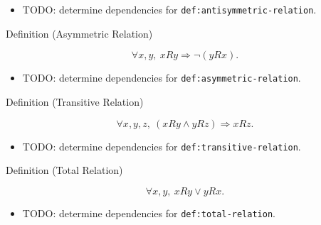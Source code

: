 \begin{dependencies}
\begin{itemize}
  \item TODO: determine dependencies for \texttt{def:antisymmetric-relation}.
\end{itemize}
\end{dependencies}

\begin{definitionbox}{Definition (Asymmetric Relation)}
\begin{definition}
\label{def:asymmetric-relation}
\[
\forall x,y,\ xRy \Longrightarrow \neg(yRx).
\]
\end{definition}
\end{definitionbox}

\begin{dependencies}
\begin{itemize}
  \item TODO: determine dependencies for \texttt{def:asymmetric-relation}.
\end{itemize}
\end{dependencies}

\begin{definitionbox}{Definition (Transitive Relation)}
\begin{definition}
\label{def:transitive-relation}
\[
\forall x,y,z,\ (xRy\land yRz)\Longrightarrow xRz.
\]
\end{definition}
\end{definitionbox}

\begin{dependencies}
\begin{itemize}
  \item TODO: determine dependencies for \texttt{def:transitive-relation}.
\end{itemize}
\end{dependencies}

\begin{definitionbox}{Definition (Total Relation)}
\begin{definition}
\label{def:total-relation}
\[
\forall x,y,\ xRy\lor yRx.
\]
\end{definition}
\end{definitionbox}

\begin{dependencies}
\begin{itemize}
  \item TODO: determine dependencies for \texttt{def:total-relation}.
\end{itemize}
\end{dependencies}

